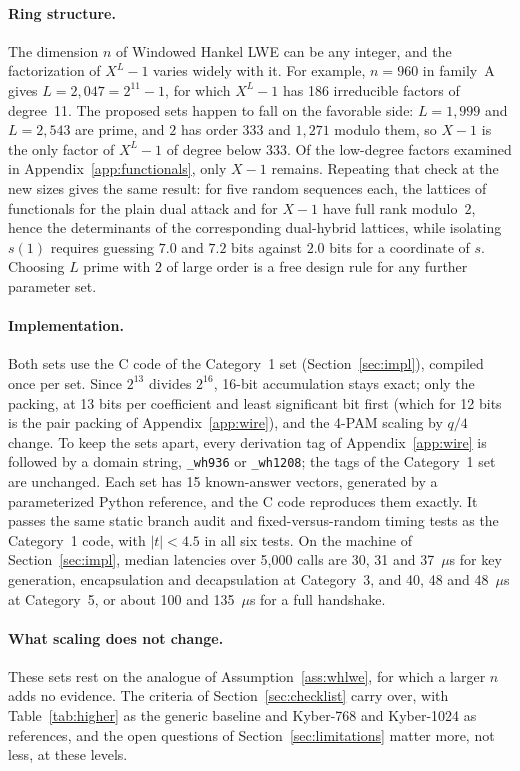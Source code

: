 \documentclass[11pt,a4paper]{article}
\theoremstyle{definition}
\begin{document}
\paragraph{Ring structure.} The dimension $n$ of Windowed Hankel LWE can be any integer, and the factorization of $X^L - 1$ varies widely with it. For example, $n = 960$ in family~A gives $L = 2{,}047 = 2^{11} - 1$, for which $X^L - 1$ has 186 irreducible factors of degree~11. The proposed sets happen to fall on the favorable side: $L = 1{,}999$ and $L = 2{,}543$ are prime, and $2$ has order $333$ and $1{,}271$ modulo them, so $X - 1$ is the only factor of $X^L - 1$ of degree below $333$. Of the low-degree factors examined in Appendix~\ref{app:functionals}, only $X - 1$ remains. Repeating that check at the new sizes gives the same result: for five random sequences each, the lattices of functionals for the plain dual attack and for $X - 1$ have full rank modulo~$2$, hence the determinants of the corresponding dual-hybrid lattices, while isolating $s(1)$ requires guessing $7.0$ and $7.2$ bits against $2.0$ bits for a coordinate of $s$. Choosing $L$ prime with $2$ of large order is a free design rule for any further parameter set.

\paragraph{Implementation.} Both sets use the C code of the Category~1 set (Section~\ref{sec:impl}), compiled once per set. Since $2^{13}$ divides $2^{16}$, 16-bit accumulation stays exact; only the packing, at 13 bits per coefficient and least significant bit first (which for 12 bits is the pair packing of Appendix~\ref{app:wire}), and the 4-PAM scaling by $q/4$ change. To keep the sets apart, every derivation tag of Appendix~\ref{app:wire} is followed by a domain string, \texttt{\_wh936} or \texttt{\_wh1208}; the tags of the Category~1 set are unchanged. Each set has 15 known-answer vectors, generated by a parameterized Python reference, and the C code reproduces them exactly. It passes the same static branch audit and fixed-versus-random timing tests as the Category~1 code, with $|t| < 4.5$ in all six tests. On the machine of Section~\ref{sec:impl}, median latencies over 5{,}000 calls are 30, 31 and 37~$\mu$s for key generation, encapsulation and decapsulation at Category~3, and 40, 48 and 48~$\mu$s at Category~5, or about 100 and 135~$\mu$s for a full handshake.

\paragraph{What scaling does not change.} These sets rest on the analogue of Assumption~\ref{ass:whlwe}, for which a larger $n$ adds no evidence. The criteria of Section~\ref{sec:checklist} carry over, with Table~\ref{tab:higher} as the generic baseline and Kyber-768 and Kyber-1024 as references, and the open questions of Section~\ref{sec:limitations} matter more, not less, at these levels.
\end{document}
